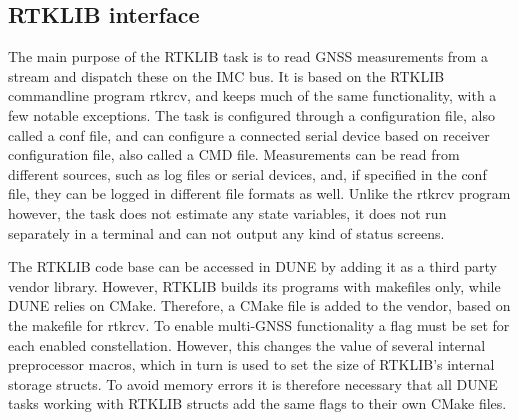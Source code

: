 \subsection{RTKLIB interface}
    The main purpose of the RTKLIB task is to read GNSS measurements from a stream and dispatch these on the IMC bus. It is based on the RTKLIB commandline program rtkrcv, and keeps much of the same functionality, with a few notable exceptions. The task is configured through a configuration file, also called a conf file, and can configure a connected serial device based on receiver configuration file, also called a CMD file. Measurements can be read from different sources, such as log files or serial devices, and, if specified in the conf file, they can be logged in different file formats as well. Unlike the rtkrcv program however, the task does not estimate any state variables, it does not run separately in a terminal and can not output any kind of status screens. \\
    
    The RTKLIB code base can be accessed in DUNE by adding it as a third party vendor library. However, RTKLIB builds its programs with makefiles only, while DUNE relies on CMake. Therefore, a CMake file is added to the vendor, based on the makefile for rtkrcv. To enable multi-GNSS functionality a flag must be set for each enabled constellation. However, this changes the value of several internal preprocessor macros, which in turn is used to set the size of RTKLIB's internal storage structs. To avoid memory errors it is therefore necessary that all DUNE tasks working with RTKLIB structs add the same flags to their own CMake files.\\
    
